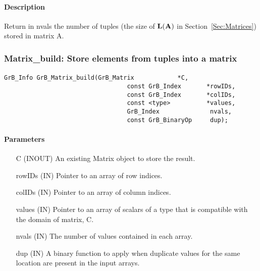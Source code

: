 \paragraph{Description}

Return in {\sf nvals} the number of tuples (the size of $\bold{L}({\bf A})$
in Section~\ref{Sec:Matrices}) stored in matrix {\sf A}.


\subsubsection{{\sf Matrix\_build}: Store elements from tuples into a matrix}
\label{Sec:Matrix_build}

\paragraph{\syntax}

\begin{Verbatim}[samepage=true]    
        GrB_Info GrB_Matrix_build(GrB_Matrix            *C,
                                  const GrB_Index       *rowIDs,
                                  const GrB_Index       *colIDs, 
                                  const <type>          *values,
                                  GrB_Index              nvals,
                                  const GrB_BinaryOp     dup);
\end{Verbatim}

\paragraph{Parameters}

\begin{itemize}[leftmargin=1.1in]
    \item[{\sf C}]      ({\sf INOUT}) An existing Matrix object to store the result.
    \item[{\sf rowIDs}] ({\sf IN}) Pointer to an array of row indices. 
    \item[{\sf colIDs}] ({\sf IN}) Pointer to an array of column indices. 
    \item[{\sf values}] ({\sf IN}) Pointer to an array of scalars of a type that
                                   is compatible with the domain of matrix, {\sf C}.
    \item[{\sf nvals}]  ({\sf IN}) The number of values contained in each array.
    \item[{\sf dup}]    ({\sf IN}) A binary function to apply when duplicate values 
                        for the same location are present in the input arrays. 
\end{itemize}

